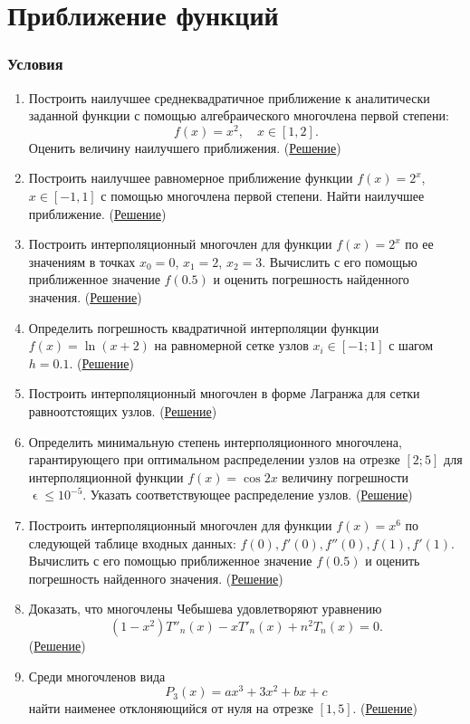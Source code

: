 \documentclass[a4paper, 12pt]{article}
\renewcommand{\leq}{\leqslant}
\renewcommand{\epsilon}{\upvarepsilon}
\begin{document}
	\section*{Приближение функций}
	\subsubsection*{Условия}
	\begin{enumerate}
		\item Построить наилучшее среднеквадратичное приближение к аналитически заданной функции с помощью алгебраического многочлена первой степени: $$f(x) = x^2,\quad x \in [1,2].$$ Оценить величину наилучшего приближения. (\hyperlink{t1}{Решение})
		\item Построить наилучшее равномерное приближение функции $f(x) = 2^x$, $x\in [-1,1]$ с помощью многочлена первой степени. Найти наилучшее приближение. (\hyperlink{t2}{Решение})
		\item Построить интерполяционный многочлен для функции $f(x) = 2^x$ по ее значениям в точках $x_0 = 0$, $x_1 = 2$, $x_2 = 3$. Вычислить с его помощью приближенное значение $f(0.5)$ и оценить погрешность найденного значения. (\hyperlink{t3}{Решение})
		\item Определить погрешность квадратичной интерполяции функции $f(x) = \ln(x+2)$ на равномерной сетке узлов $x_i \in [-1; 1]$ с шагом $h = 0.1$. (\hyperlink{t4}{Решение})
		\item Построить интерполяционный многочлен в форме Лагранжа для сетки равноотстоящих узлов.  (\hyperlink{t5}{Решение})
		\item Определить минимальную степень интерполяционного многочлена, гарантирующего при оптимальном распределении узлов на отрезке $[2;5]$ для интерполяционной функции $f(x) = \cos 2x$ величину погрешности $\epsilon \leq 10^{-5}$. Указать соответствующее распределение узлов. (\hyperlink{t6}{Решение})
		\item Построить интерполяционный многочлен для функции $f(x) = x^6$ по следующей таблице входных данных: $f(0), f'(0), f''(0), f(1), f'(1)$. Вычислить с его помощью приближенное значение $f(0.5)$ и оценить погрешность найденного значения. (\hyperlink{t7}{Решение})
		\item Доказать, что многочлены Чебышева удовлетворяют уравнению $$(1-x^2)T''_n(x) - xT'_n(x) + n^2 T_n(x)=0.$$ (\hyperlink{t8}{Решение})
		\item Среди многочленов вида $$P_3(x) = ax^3 + 3x^2 + bx+c$$ найти наименее отклоняющийся от нуля на отрезке $[1,5]$. (\hyperlink{t9}{Решение})

\end{enumerate}
\end{document}
